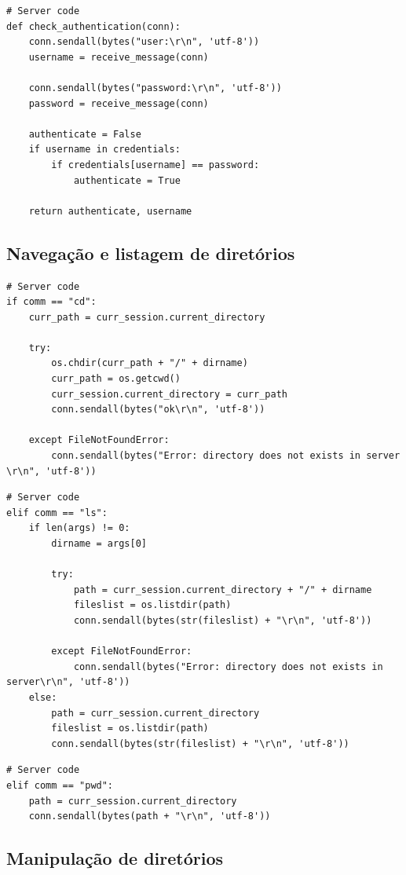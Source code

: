\documentclass[conference]{IEEEtran}
\begin{document}
\begin{lstlisting}
# Server code
def check_authentication(conn):
	conn.sendall(bytes("user:\r\n", 'utf-8'))
	username = receive_message(conn)

	conn.sendall(bytes("password:\r\n", 'utf-8'))
	password = receive_message(conn)
	
	authenticate = False
	if username in credentials:
		if credentials[username] == password:
			authenticate = True

	return authenticate, username
\end{lstlisting}

\subsection{Navegação e listagem de diretórios}

\begin{lstlisting}
# Server code
if comm == "cd":
	curr_path = curr_session.current_directory

	try:
	    os.chdir(curr_path + "/" + dirname)
	    curr_path = os.getcwd()
	    curr_session.current_directory = curr_path
	    conn.sendall(bytes("ok\r\n", 'utf-8'))

	except FileNotFoundError:
	    conn.sendall(bytes("Error: directory does not exists in server \r\n", 'utf-8'))
\end{lstlisting}

\begin{lstlisting}
# Server code
elif comm == "ls":
	if len(args) != 0:
	    dirname = args[0]
	    
	    try:
	    	path = curr_session.current_directory + "/" + dirname
	    	fileslist = os.listdir(path)
			conn.sendall(bytes(str(fileslist) + "\r\n", 'utf-8'))

	    except FileNotFoundError:
			conn.sendall(bytes("Error: directory does not exists in server\r\n", 'utf-8'))
	else:
		path = curr_session.current_directory
		fileslist = os.listdir(path)
	    conn.sendall(bytes(str(fileslist) + "\r\n", 'utf-8'))
\end{lstlisting}

\begin{lstlisting}
# Server code
elif comm == "pwd":
	path = curr_session.current_directory
	conn.sendall(bytes(path + "\r\n", 'utf-8'))
\end{lstlisting}

\subsection{Manipulação de diretórios}
\end{document}
